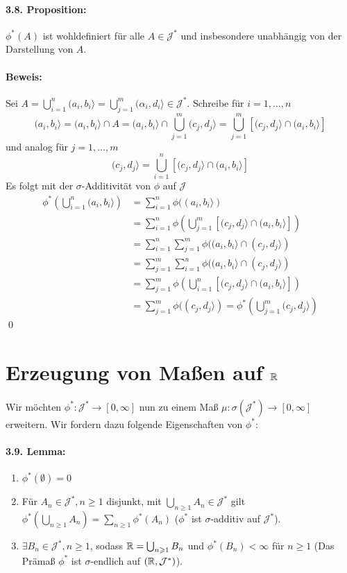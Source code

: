 \documentclass[12pt]{report}
\begin{document}
\paragraph{3.8. Proposition:}$\phi^*(A)$ ist wohldefiniert f\"ur alle $A\in\mathcal{J}^*$ und insbesondere unabh\"angig von der Darstellung von $A$.
 
 \paragraph{Beweis:}Sei $A=\bigcup_{i=1}^n(a_i,b_i\rangle=\bigcup_{j=1}^m(\alpha_i,d_i\rangle\in\mathcal{J}^*$. Schreibe f\"ur $i=1,\hdots,n$
$$(a_i,b_i\rangle=(a_i,b_i\rangle\cap A=(a_i,b_i\rangle\cap\bigcup_{j=1}^m(c_j,d_j\rangle=\bigcup_{j=1}^m\left[(c_j,d_j\rangle\cap(a_i,b_i\rangle\right]$$
 und analog f\"ur $j=1,\hdots,m$
 $$(c_j,d_j\rangle=\bigcup_{i=1}^n\left[(c_j,d_j\rangle\cap(a_i,b_i\rangle\right]$$
 Es folgt mit der $\sigma$-Additivit\"at von $\phi$ auf $\mathcal{J}$
 \begin{align*}
     \phi^*\left(\bigcup_{i=1}^n(a_i,b_i\rangle\right)&=\sum_{i=1}^n\phi((a_i,b_i\rangle)\\
     &=\sum_{i=1}^n\phi\left(\bigcup_{j=1}^m\left[(c_j,d_j\rangle\cap(a_i,b_i\rangle\right]\right)\\
     &=\sum_{i=1}^n\sum_{j=1}^m\phi((a_i,b_i\rangle\cap(c_j,d_j\rangle)\\
     &=\sum_{j=1}^m\sum_{i=1}^n\phi((a_i,b_i\rangle\cap(c_j,d_j\rangle)\\
     &=\sum_{j=1}^m\phi\left(\bigcup_{i=1}^n\left[(c_j,d_j\rangle\cap(a_i,b_i\rangle\right]\right)\\
     &=\sum_{j=1}^m\phi((c_j,d_j\rangle)=\phi^*\left(\bigcup_{j=1}^m(c_j,d_j\rangle\right)
 \end{align*}
 \qed
 
 \section*{Erzeugung von Ma\ss{}en auf $\mathbb{R}$}
 Wir m\"ochten $\phi^*:\mathcal{J}^*\to[0,\infty]$ nun zu einem Ma\ss{} $\mu:\sigma(\mathcal{J}^*)\to[0,\infty]$ erweitern. Wir fordern dazu folgende Eigenschaften von $\phi^*$:
 
\paragraph{3.9. Lemma:}
\begin{enumerate}[label=(\roman*)]
    \item $\phi^*(\emptyset)=0$
    \item F\"ur $A_n\in\mathcal{J}^*,n\geq1$ disjunkt, mit $\bigcup_{n\geq1}A_n\in\mathcal{J}^*$ gilt $\phi^*\left(\bigcup_{n\geq1}A_n\right)=\sum_{n\geq1}\phi^*(A_n)$ ($\phi^*$ ist $\sigma$-additiv auf $\mathcal{J}^*$).
    \item $\exists B_n\in\mathcal{J}^*,n\geq1$, sodass $\mathbb{R}=\bigcup_{n\geqslant1}B_n$ und $\phi^*(B_n)<\infty$ f\"ur $n\geq1$ (Das Pr\"ama\ss{} $\phi^*$ ist $\sigma$-endlich auf $(\mathbb{R},\mathcal{J}^*) $).
\end{enumerate}
\end{document}
